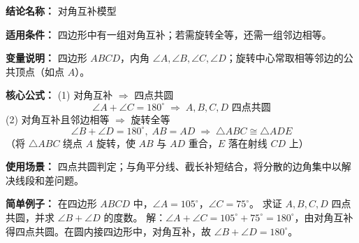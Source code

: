 \textbf{结论名称：} 对角互补模型

\textbf{适用条件：} 四边形中有一组对角互补；若需旋转全等，还需一组邻边相等。

\textbf{变量说明：} 四边形 \(ABCD\)，内角 \(\angle A,\angle B,\angle C,\angle D\)；旋转中心常取相等邻边的公共顶点（如点 \(A\)）。

\textbf{核心公式：}
(1) 对角互补 \(\Rightarrow\) 四点共圆
\[
\boxed{\angle A + \angle C = 180^\circ \;\Longrightarrow\; A,B,C,D \text{ 四点共圆}}
\]
(2) 对角互补且邻边相等 \(\Rightarrow\) 旋转全等
\[
\boxed{\angle B + \angle D = 180^\circ,\; AB = AD \;\Longrightarrow\; \triangle ABC \cong \triangle ADE}
\]
（将 \(\triangle ABC\) 绕点 \(A\) 旋转，使 \(AB\) 与 \(AD\) 重合，\(E\) 落在射线 \(CD\) 上）

\textbf{使用场景：} 四点共圆判定；与角平分线、截长补短结合，将分散的边角集中以解决线段和差问题。

\textbf{简单例子：} 在四边形 \(ABCD\) 中，\(\angle A = 105^\circ\)，\(\angle C = 75^\circ\)。
求证 \(A,B,C,D\) 四点共圆，并求 \(\angle B + \angle D\) 的度数。
解：\(\angle A + \angle C = 105^\circ + 75^\circ = 180^\circ\)，由对角互补得四点共圆。在圆内接四边形中，对角互补，故 \(\angle B + \angle D = 180^\circ\)。
